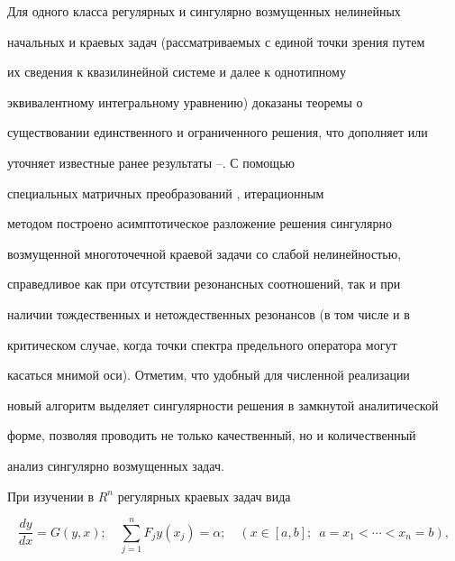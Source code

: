 \maketitle 


\label{begin} 


 


Для одного класса регулярных и сингулярно возмущенных нелинейных 


начальных и краевых задач (рассматриваемых с единой точки зрения путем 


их сведения к квазилинейной системе и далее к однотипному 


эквивалентному интегральному уравнению) доказаны теоремы о 


существовании единственного и ограниченного решения, что дополняет или 


уточняет известные ранее результаты \cite{1}--\cite{4}. С помощью 


специальных матричных преобразований \cite{5}, \cite{6} итерационным 


методом построено асимптотическое разложение решения сингулярно 


возмущенной многоточечной краевой задачи со слабой нелинейностью, 


справедливое как при отсутствии резонансных соотношений, так и при 


наличии тождественных и нетождественных резонансов (в том числе и в 


критическом случае, когда точки спектра предельного оператора могут 


касаться мнимой оси). Отметим, что удобный для численной реализации 


новый алгоритм выделяет сингулярности решения в замкнутой аналитической 


форме, позволяя проводить не только качественный, но и количественный 


анализ сингулярно возмущенных задач. 


 


При изучении в $R^n$ регулярных краевых задач вида 


\begin{equation} 


\frac{dy}{dx}=G(y,x);\quad \sum^n_{j=1}F_j y(x_j)=\alpha;\quad 


(x\in[a,b];\ \; a=x_1<\dotsb<x_n=b), 


\end{equation} 


